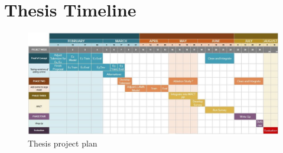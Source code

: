 \section{Thesis Timeline}

\begin{figure}[H]
    \centering
    \includegraphics[width=1\textwidth]{IMAGES/project_plan.jpg} 
    \caption{Thesis project plan}
    \label{fig:projectplan}
\end{figure}


